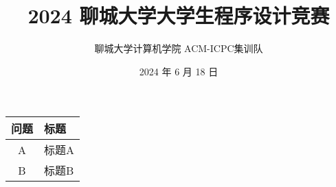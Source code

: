 \documentclass[11pt]{ctexart}
\title{2024 聊城大学大学生程序设计竞赛}
\date{2024 年 6 月 18 日}
\author{聊城大学计算机学院 ACM-ICPC集训队}
\begin{document}
\maketitle
\begin{table}[h!]
\centering
\begin{tabular}{|c|p{7cm}|}
\hline
\textbf{问题} & \textbf{标题} \\
\hline
A & 标题A \\
B & 标题B \\
\hline
\end{tabular}
\end{table}
\end{document}
